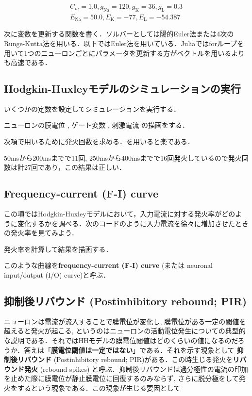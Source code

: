 \begin{align}
C_m=1.0, g_{\text{Na}}=120, g_{\text{K}}=36, g_{\text{L}}=0.3\\
E_{\text{Na}}=50.0, E_{\text{K}}=-77, E_{\text{L}}=-54.387 
\end{align}


次に変数を更新する関数を書く．ソルバーとしては陽的Euler法または4次のRunge-Kutta法を用いる．以下ではEuler法を用いている．Juliaではforループを用いて1つのニューロンごとにパラメータを更新する方がベクトルを用いるよりも高速である．

\subsection{Hodgkin-Huxleyモデルのシミュレーションの実行}
いくつかの定数を設定してシミュレーションを実行する．

ニューロンの膜電位 , ゲート変数 , 刺激電流 の描画をする．


次項で用いるために発火回数を求める．を用いると楽である．

50msから200msまでで11回, 250msから400msまでで16回発火しているので発火回数は計27回であり，この結果は正しい．
\subsection{Frequency-current (F-I) curve}
この項ではHodgkin-Huxleyモデルにおいて，入力電流に対する発火率がどのように変化するかを調べる．次のコードのように入力電流を徐々に増加させたときの発火率を見てみよう．

発火率を計算して結果を描画する．



このような曲線を\textbf{frequency-current (F-I) curve} (または neuronal input/output (I/O) curve)と呼ぶ．
\subsection{抑制後リバウンド (Postinhibitory rebound; PIR)}
ニューロンは電流が流入することで膜電位が変化し, 膜電位がある一定の閾値を超えると発火が起こる, というのはニューロンの活動電位発生についての典型的な説明である．それではHHモデルの膜電位閾値はどのくらいの値になるのだろうか．答えは「\textbf{膜電位閾値は一定ではない}」である．それを示す現象として \textbf{抑制後リバウンド} (Postinhibitory rebound; PIR)がある．この時生じる発火を\textbf{リバウンド発火} (rebound spikes) 
と呼ぶ．抑制後リバウンドは過分極性の電流の印加を止めた際に膜電位が静止膜電位に回復するのみならず, さらに脱分極をして発火をするという現象である．この現象が生じる要因として

